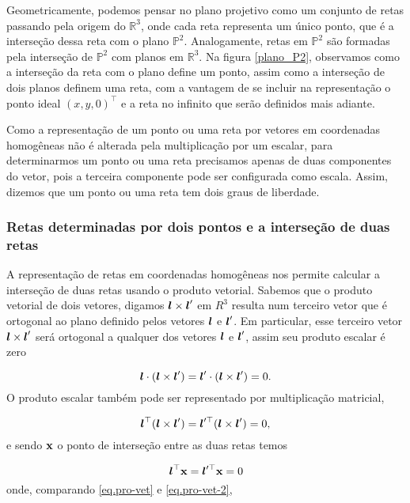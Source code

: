 Geometricamente, podemos pensar no plano projetivo como um conjunto de retas passando pela origem do $\mathbb{R}^3$, onde cada reta representa um único ponto, que é a interseção dessa reta com o plano $\mathbb{P}^2$. Analogamente, retas em $\mathbb{P}^2$ são formadas pela interseção de $\mathbb{P}^2$ com planos em $\mathbb{R}^3$. Na figura \ref{plano_P2}, observamos como a interseção da reta com o plano define um ponto, assim como a interseção de dois planos definem uma reta, com a vantagem de se incluir na representação o ponto ideal $(x,y,0)^\top$ e a reta no infinito que serão definidos mais adiante.


Como a representação de um ponto ou uma reta por vetores em coordenadas homogêneas não é alterada pela multiplicação por um escalar,  para determinarmos um ponto ou uma reta precisamos apenas de duas componentes do vetor, pois a terceira componente pode ser configurada como escala. Assim, dizemos que um ponto ou uma reta tem dois graus de liberdade.
\\

\subsubsection*{Retas determinadas por dois pontos e a interseção de duas retas}

A representação de retas em coordenadas homogêneas nos permite calcular a interseção de duas retas usando o produto vetorial. Sabemos que o produto vetorial de dois vetores, digamos $\boldsymbol{l}\times\boldsymbol{l}'$ em $R^3$ resulta num terceiro vetor que é ortogonal ao plano definido pelos vetores $\boldsymbol{l}$ e $\boldsymbol{l}'$. Em particular, esse terceiro vetor $\boldsymbol{l}\times\boldsymbol{l}'$ será ortogonal a qualquer dos vetores $\boldsymbol{l}$ e $\boldsymbol{l}'$, assim seu produto escalar é zero

\begin{equation*}
\boldsymbol{l}\cdot(\boldsymbol{l}\times\boldsymbol{l}')=\boldsymbol{l}'\cdot(\boldsymbol{l}\times\boldsymbol{l}')=0.
\end{equation*}
O produto escalar também pode ser representado por multiplicação matricial,

\begin{equation}\label{eq.pro-vet}
\boldsymbol{l}^\top(\boldsymbol{l}\times\boldsymbol{l}')=\boldsymbol{l}'^\top(\boldsymbol{l}\times\boldsymbol{l}')=0,
\end{equation}
e sendo $\mathbf{x}$ o ponto de interseção entre as duas retas temos

\begin{equation}\label{eq.pro-vet-2}
\boldsymbol{l}^\top\mathbf{x}=\boldsymbol{l}'^\top\mathbf{x}=0
\end{equation}
onde, comparando \ref{eq.pro-vet} e \ref{eq.pro-vet-2},

